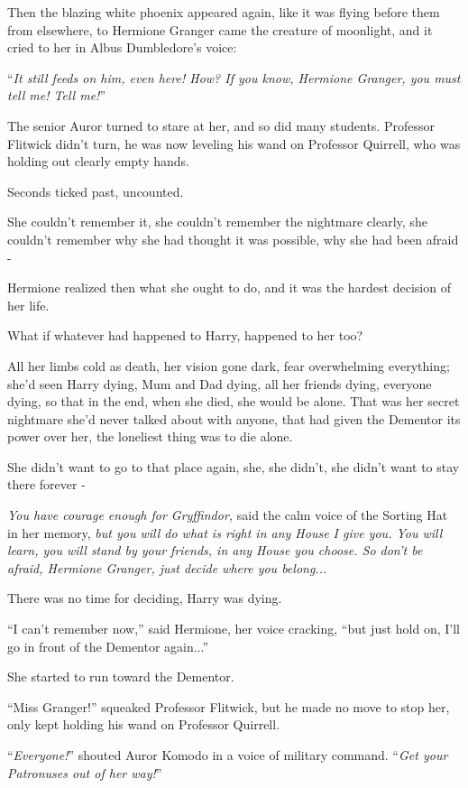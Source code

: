 Then the blazing white phoenix appeared again, like it was flying before them from elsewhere, to Hermione Granger came the creature of moonlight, and it cried to her in Albus Dumbledore's voice:

``\emph{It still feeds on him, even here! How? If you know, Hermione Granger, you must tell me! Tell me!}''

The senior Auror turned to stare at her, and so did many students. Professor Flitwick didn't turn, he was now leveling his wand on Professor Quirrell, who was holding out clearly empty hands.

Seconds ticked past, uncounted.

She couldn't remember it, she couldn't remember the nightmare clearly, she couldn't remember why she had thought it was possible, why she had been afraid -

Hermione realized then what she ought to do, and it was the hardest decision of her life.

What if whatever had happened to Harry, happened to her too?

All her limbs cold as death, her vision gone dark, fear overwhelming everything; she'd seen Harry dying, Mum and Dad dying, all her friends dying, everyone dying, so that in the end, when she died, she would be alone. That was her secret nightmare she'd never talked about with anyone, that had given the Dementor its power over her, the loneliest thing was to die alone.

She didn't want to go to that place again, she, she didn't, she didn't want to stay there forever -

\emph{You have courage enough for Gryffindor,} said the calm voice of the Sorting Hat in her memory, \emph{but you will do what is right in any House I give you. You will learn, you will stand by your friends, in any House you choose. So don't be afraid, Hermione Granger, just decide where you belong...}

There was no time for deciding, Harry was dying.

``I can't remember now,'' said Hermione, her voice cracking, ``but just hold on, I'll go in front of the Dementor again...''

She started to run toward the Dementor.

``Miss Granger!'' squeaked Professor Flitwick, but he made no move to stop her, only kept holding his wand on Professor Quirrell.

``\emph{Everyone!}'' shouted Auror Komodo in a voice of military command. ``\emph{Get your Patronuses out of her way!}''


